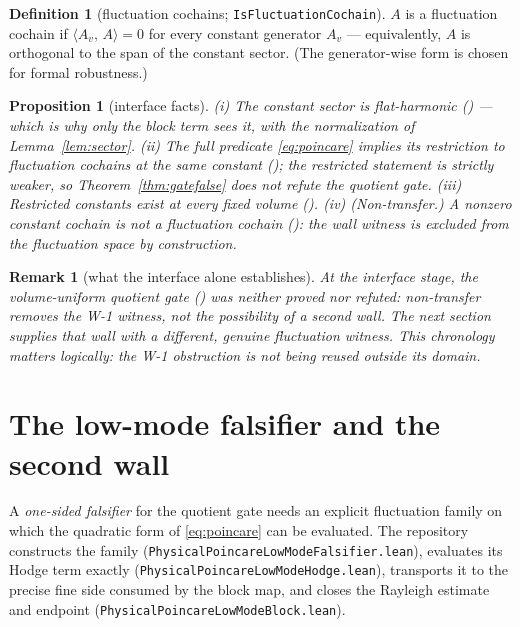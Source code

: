 \documentclass[11pt]{article}
\newtheorem{proposition}[theorem]{Proposition}
\newtheorem{remark}[theorem]{Remark}
\theoremstyle{definition}
\newtheorem{definition}[theorem]{Definition}
\newcommand{\lean}[1]{\texttt{#1}}
\newcommand{\inn}[2]{\langle #1,\, #2\rangle}
\begin{document}
\begin{definition}[fluctuation cochains; \lean{IsFluctuationCochain}]
$A$ is a fluctuation cochain if $\inn{A_v}{A}=0$ for every constant
generator $A_v$ --- equivalently, $A$ is orthogonal to the span of the
constant sector.  (The generator-wise form is chosen for formal
robustness.)
\end{definition}

\begin{proposition}[interface facts]
\raggedright
\emph{(i)} The constant sector is flat-harmonic
() --- which is why only the block
term sees it, with the normalization of Lemma~\ref{lem:sector}.
\emph{(ii)} The full predicate \eqref{eq:poincare} implies its
restriction to fluctuation cochains at the same constant
(); the restricted
statement is strictly weaker, so Theorem~\ref{thm:gatefalse} does
\emph{not} refute the quotient gate.
\emph{(iii)} Restricted constants exist at every fixed volume
().
\emph{(iv) (Non-transfer.)}  A nonzero constant cochain is not a
fluctuation cochain (): the wall
\emph{witness} is excluded from the fluctuation space by construction.
\end{proposition}

\begin{remark}[what the interface alone establishes]
\raggedright
At the interface stage, the volume-uniform quotient gate
() was neither proved nor
refuted: non-transfer removes the W-1 witness, not the possibility of a
second wall.  The next section supplies that wall with a different,
genuine fluctuation witness.  This chronology matters logically: the
W-1 obstruction is not being reused outside its domain.
\end{remark}

\section{The low-mode falsifier and the second wall}\label{sec:falsifier}

{\raggedright
A \emph{one-sided falsifier} for the quotient gate needs an explicit
fluctuation family on which the quadratic form of \eqref{eq:poincare}
can be evaluated.  The repository constructs the family
(\lean{PhysicalPoincareLowModeFalsifier.lean}), evaluates its Hodge term
exactly (\lean{PhysicalPoincareLowModeHodge.lean}), transports it to the
precise fine side consumed by the block map, and closes the Rayleigh
estimate and endpoint (\lean{PhysicalPoincareLowModeBlock.lean}).\par}
\end{document}
